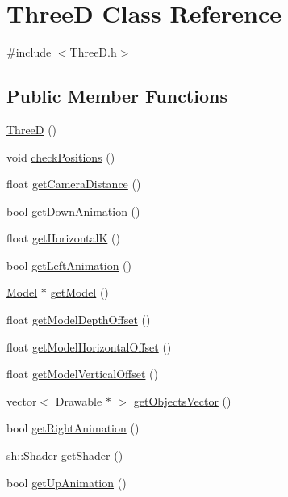 \hypertarget{classThreeD}{}\section{ThreeD Class Reference}
\label{classThreeD}


{\ttfamily \#include $<$Three\+D.\+h$>$}

\subsection*{Public Member Functions}
\begin{DoxyCompactItemize}
\item 
\hyperlink{classThreeD_ad79fb958b989b2c1358e33a0a823cf8a}{ThreeD} ()
\item 
void \hyperlink{classThreeD_a5e5f226858ce49041844422d83ad19b3}{check\+Positions} ()
\item 
float \hyperlink{classThreeD_aff67affc775619000703802fe516b8e7}{get\+Camera\+Distance} ()
\item 
bool \hyperlink{classThreeD_a44b5aaeed06e609bd522618b84fef9d5}{get\+Down\+Animation} ()
\item 
float \hyperlink{classThreeD_a1db0bd4d8c8e545661bd82600ebcbdcd}{get\+HorizontalK} ()
\item 
bool \hyperlink{classThreeD_ad148b4894dccdb057883fe3b2d42387f}{get\+Left\+Animation} ()
\item 
\hyperlink{classModel}{Model} $\ast$ \hyperlink{classThreeD_acf94ccdd1282a0f7fcb129013ef8eb22}{get\+Model} ()
\item 
float \hyperlink{classThreeD_af6012e8fd642ebbc5aec91373b7fd97c}{get\+Model\+Depth\+Offset} ()
\item 
float \hyperlink{classThreeD_aeda2b7fe09f9270ee1a35edf452ec8ad}{get\+Model\+Horizontal\+Offset} ()
\item 
float \hyperlink{classThreeD_a95759f6b213d70fc0fe102daa4c6488b}{get\+Model\+Vertical\+Offset} ()
\item 
vector$<$ Drawable $\ast$ $>$ \hyperlink{classThreeD_a0712cb34196c20ea0a9f0896901c44f0}{get\+Objects\+Vector} ()
\item 
bool \hyperlink{classThreeD_a2ba006aadb8e3e328c697529f73bab17}{get\+Right\+Animation} ()
\item 
\hyperlink{classsh_1_1Shader}{sh\+::\+Shader} \hyperlink{classThreeD_a91c01d4795244bf16a5c2a978faeb2d2}{get\+Shader} ()
\item 
bool \hyperlink{classThreeD_a1c5e018b1430fe75b979d62a88bc3a7c}{get\+Up\+Animation} ()

\end{DoxyCompactItemize}
